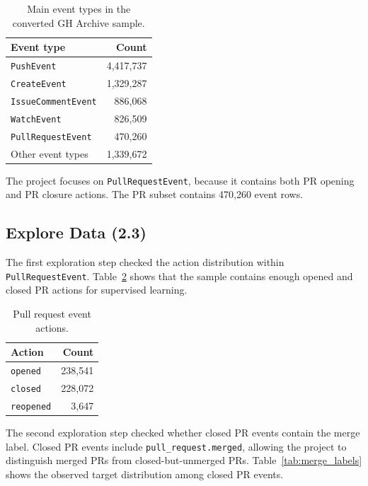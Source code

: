 \begin{table}[H]
    \centering
    \caption{Main event types in the converted GH Archive sample.}
    \label{tab:event_types}
    \begin{tabular}{lr}
        \toprule
        Event type & Count \\
        \midrule
        \texttt{PushEvent} & 4,417,737 \\
        \texttt{CreateEvent} & 1,329,287 \\
        \texttt{IssueCommentEvent} & 886,068 \\
        \texttt{WatchEvent} & 826,509 \\
        \texttt{PullRequestEvent} & 470,260 \\
        Other event types & 1,339,672 \\
        \bottomrule
    \end{tabular}
\end{table}

The project focuses on \texttt{PullRequestEvent}, because it contains both PR opening and PR closure actions.
The PR subset contains 470,260 event rows.

\subsection{Explore Data (2.3)}

The first exploration step checked the action distribution within \texttt{PullRequestEvent}.
Table~\ref{tab:pr_actions} shows that the sample contains enough opened and closed PR actions for supervised learning.

\begin{table}[H]
    \centering
    \caption{Pull request event actions.}
    \label{tab:pr_actions}
    \begin{tabular}{lr}
        \toprule
        Action & Count \\
        \midrule
        \texttt{opened} & 238,541 \\
        \texttt{closed} & 228,072 \\
        \texttt{reopened} & 3,647 \\
        \bottomrule
    \end{tabular}
\end{table}

The second exploration step checked whether closed PR events contain the merge label. Closed PR events
include \texttt{pull\_request.merged}, allowing the project to distinguish merged PRs from
closed-but-unmerged PRs. Table~\ref{tab:merge_labels} shows the observed target distribution among closed PR events.

